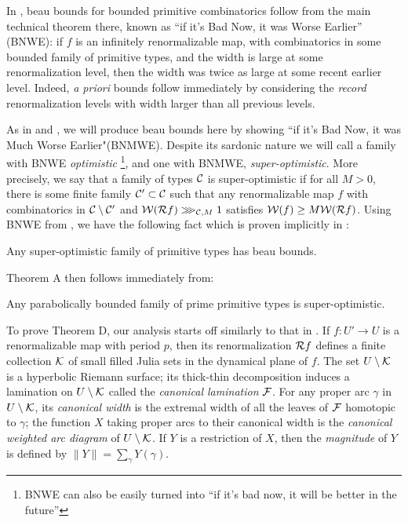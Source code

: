 \documentclass[12pt]{amsart}
\begin{document}
In \cite{K06}, beau bounds for bounded primitive combinatorics follow from the main technical theorem there, known as ``if it's Bad Now, it was Worse Earlier'' (BNWE):
if $f$ is an infinitely renormalizable \pql map,
with combinatorics in some bounded family of primitive types,
and the width is large at some renormalization level, 
then the width was twice as large at some recent earlier level.
  Indeed, \textit{a priori} bounds follow immediately by considering the {\em record} renormalization levels 
  with width larger than all previous levels.


As in \cite{KL:decorations} and \cite{KL:molecules},
we will produce beau bounds here by showing ``if it's Bad Now, it was Much Worse Earlier"(BNMWE).
Despite its sardonic nature
we will call a family with BNWE \emph{optimistic}%
\footnote{ BNWE can also be easily turned into ``if it's bad now, it will be better in the future''}, 
and one with BNMWE, \emph{super-optimistic}.
More precisely,
we say that a family of  types $\mathcal C$ is super-optimistic
if for all $M>0$, 
there is some finite family $\mathcal C'\subset \mathcal C$ such that any renormalizable \pql map $f$ with combinatorics in $\mathcal C\setminus \mathcal C'$ and $\mathcal W(\mathcal R f)\ggg_{\mathcal C, M} 1$ satisfies $\mathcal W(f)\geq M\mathcal W(\mathcal R f)$.
Using BNWE from \cite{K06}, 
we have the following fact which is proven  implicitly in \cite{KL:decorations}:
\begin{lemmaA}
    Any super-optimistic family of primitive types  has beau bounds.
\end{lemmaA}

Theorem A  then follows immediately from:
\begin{thmD}
	Any parabolically bounded family of prime primitive types is super-optimistic.
\end{thmD}


To prove Theorem D, our analysis starts off similarly to that in \cite{K06}. If $f: U'\to U$ is a renormalizable \pql map with period $p$, then its renormalization $\mathcal R f$ defines a finite collection $\mathcal K$ of small filled Julia sets in the dynamical plane of $f$. The set $U\setminus \mathcal K$ is a hyperbolic Riemann surface; its
 thick-thin decomposition induces a lamination on $U\setminus \mathcal K$ called the \textit{canonical lamination} $\mathcal F$. 
For any proper arc $\gamma$ in $U\setminus \mathcal K$, its \textit{canonical width} is the extremal width of all the leaves of $\mathcal F$ homotopic to $\gamma$; the function $X$ taking proper arcs to their canonical width is the \textit{canonical weighted arc diagram} of $U\setminus \mathcal K$. If $Y$ is a restriction of $X$, then the \textit{magnitude} of $Y$ is defined by $\|Y\|= \sum_\gamma Y(\gamma)$.
\end{document}
